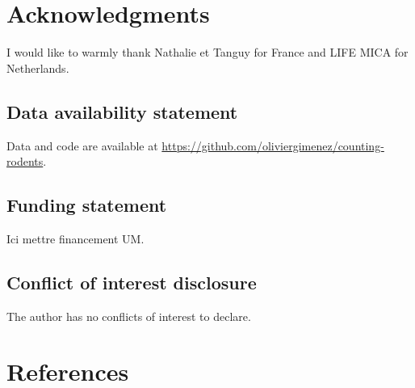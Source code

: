 \documentclass[
  11pt,
  a4paper,
]{article}
\begin{document}
\section{Acknowledgments}\label{acknowledgments}

I would like to warmly thank Nathalie et Tanguy for France and LIFE MICA for Netherlands.

\subsection{Data availability statement}\label{data-availability-statement}

Data and code are available at \href{https://github.com/oliviergimenez/counting-rodents}{https://github.com/oliviergimenez/counting-rodents}.

\subsection{Funding statement}\label{funding-statement}

Ici mettre financement UM.

\subsection{Conflict of interest disclosure}\label{conflict-of-interest-disclosure}

The author has no conflicts of interest to declare.

\section{References}\label{references}
\end{document}
